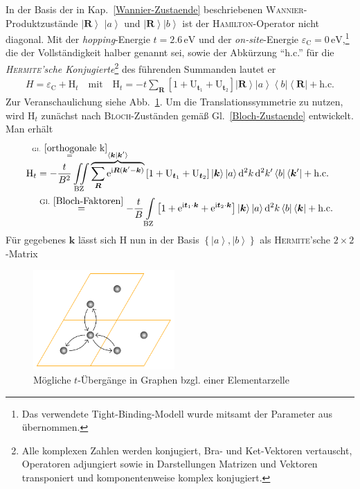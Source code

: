 \documentclass[a4paper, 10pt, twoside, openany]{book} %
\newcommand \bra[1]{\left \langle #1 \right |}
\newcommand \ket[1]{\left | #1 \right \rangle}
\newcommand \bracket[2]{\left \langle #1 \middle | #2 \right \rangle}
\newcommand \bracks[1]{\left [ #1 \right ]}
\newcommand \braces[1]{\left \lbrace #1 \right \rbrace}
\def \I {\mathrm i}
\def \E {\mathrm e}
\def \vec {\boldsymbol}
\newcommand \op[1]{\mathrm{#1}}
\def \eC {\varepsilon_\mathrm{C}}
\begin{document}
In der Basis der in Kap.~\ref{Wannier-Zustaende} beschriebenen \textsc{Wannier}-Produktzustände $\ket{\vec R}$ $\ket a$ und $\ket{\vec R} \ket b$ ist der \textsc{Hamilton}-Operator nicht diagonal. Mit der \emph{hopping}-Energie $t = 2.6\,\mathrm{eV}$ und der \emph{on-site}-Energie $\eC = 0\,\mathrm{eV}$,\footnote{Das verwendete Tight-Binding-Modell wurde mitsamt der Parameter aus \cite[S.~2]{Wehling2} übernommen.} die der Vollständigkeit halber genannt sei, sowie der Abkürzung "`h.c."' für die \emph{\textsc{Hermite}'sche Konjugierte}\footnote{Alle komplexen Zahlen werden konjugiert, Bra- und Ket-Vektoren vertauscht, Operatoren adjungiert sowie in Darstellungen Matrizen und Vektoren transponiert und komponentenweise komplex konjugiert.} des führenden Summanden lautet er
%
\begin{align}
    H = \eC + \op H_t \quad \text{mit} \quad \op H_t = -t \sum_{\vec R} \bracks{1 + \op U_{\vec t_1} + \op U_{\vec t_2}} \ket{\vec R} \ket a \bra b \bra{\vec R} + \text{h.c.}
    \label{Hamiltonian Graphen}
\end{align}
%
Zur Veranschaulichung siehe Abb.~\ref{Uebergaenge Graphen}. Um die Translationssymmetrie zu nutzen, wird $\op H_t$ zunächst nach \textsc{Bloch}-Zuständen gemäß Gl.~\ref{Bloch-Zustaende} entwickelt. Man erhält
%
\begin{align*}
    \op H_t &= -\frac t {B^2} \iint \limits_{\rm BZ} \overbrace{\sum_{\vec R} \E^{\I \vec R (\vec k' - \vec k)}}^{\mathllap{\overset{\rm Gl.~\ref{orthogonale k}} =} \bracket{\vec k}{\vec k\smash'}} \bracks{1 + \op U_{\vec t_1} + \op U_{\vec t_2}} \ket{\vec k} \ket a \mathrm d^2 k \, \mathrm d^2 k' \bra b \bra{\vec k \smash '} + \text{h.c.} \\
    & \overset {\rm Gl.~\ref{Bloch-Faktoren}} = -\frac t B \int \limits_{\rm BZ} \bracks{1 + \E^{\I \vec t_1 \cdot \vec k} + \E^{\I \vec t_2 \cdot \vec k}} \ket{\vec k} \ket a \mathrm d^2 k \bra b \bra{\vec k} + \text{h.c.}
\end{align*}
%
Für gegebenes $\vec k$ lässt sich $\op H$ nun in der Basis $\braces{\ket a, \ket b}$ als \textsc{Hermite}'sche $2 \times 2$-Matrix
%
\begin{figure}
    \centering
    \includegraphics[width=0.48\textwidth]{Abbildungen/Raumstrukturen/Graphen.pdf}
    \caption{Mögliche $t$-Übergänge in Graphen bzgl. einer Elementarzelle}
    \label{Uebergaenge Graphen}
\end{figure}
\end{document}
